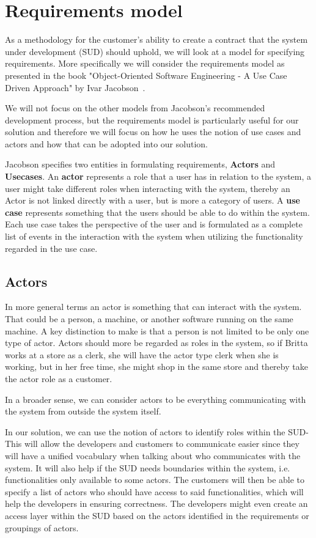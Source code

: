 \section{Requirements model}

As a methodology for the customer's ability to create a contract that the system under development (SUD) should uphold, we will look at a model for specifying requirements.
More specifically we will consider the requirements model as presented in the book "Object-Oriented Software Engineering - A Use Case Driven Approach" by Ivar Jacobson~\cite{Jacobson1992}.

We will not focus on the other models from Jacobson's recommended development process, but the requirements model is particularly useful for our solution and therefore we will focus on how he uses the notion of use cases and actors and how that can be adopted into our solution.

Jacobson specifies two entities in formulating requirements, \textbf{Actors} and \textbf{Usecases}.
An \textbf{actor} represents a role that a user has in relation to the system, a user might take different roles when interacting with the system, thereby an Actor is not linked directly with a user, but is more a category of users.
A \textbf{use case} represents something that the users should be able to do within the system. Each use case takes the perspective of the user and is formulated as a complete list of events in the interaction with the system when utilizing the functionality regarded in the use case.

\subsection{Actors}
In more general terms an actor is something that can interact with the system. That could be a person, a machine, or another software running on the same machine. 
A key distinction to make is that a person is not limited to be only one type of actor.
Actors should more be regarded as roles in the system, so if Britta works at a store as a clerk, she will have the actor type clerk when she is working, but in her free time, she might shop in the same store and thereby take the actor role as a customer. 

In a broader sense, we can consider actors to be everything communicating with the system from outside the system itself.

In our solution, we can use the notion of actors to identify roles within the SUD- 
This will allow the developers and customers to communicate easier since they will have a unified vocabulary when talking about who communicates with the system. 
It will also help if the SUD needs boundaries within the system, i.e. functionalities only available to some actors.
The customers will then be able to specify a list of actors who should have access to said functionalities, which will help the developers in ensuring correctness.
The developers might even create an access layer within the SUD based on the actors identified in the requirements or groupings of actors.

